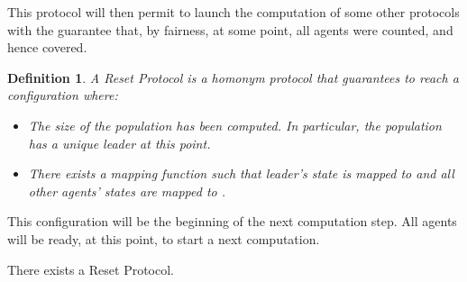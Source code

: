 \documentclass[UKenglish]{llncs}
\newtheorem{define}{Definition}
\newcommand\motnouv[1]{{\emph{#1}}}
\begin{document}
This protocol will then permit to launch the computation of some other protocols
with the guarantee that, by fairness, at some point, all agents were counted, and hence covered.


\begin{define}
A \motnouv{Reset Protocol} is a homonym protocol that guarantees to reach a configuration
where:
\begin{itemize}
\item The size of the population has been computed. In particular, the population has
a unique leader at this point.
\item There exists a mapping function  such
  that leader's state is mapped to  and 
all other agents' states are mapped to . 
\end{itemize}

\end{define}
This configuration will be the beginning of the next computation step. All
agents will be ready, at this point, to start a next computation.
\begin{proposition}\label{prop:reset}
There exists a  Reset  Protocol.
\end{proposition}
\end{document}
